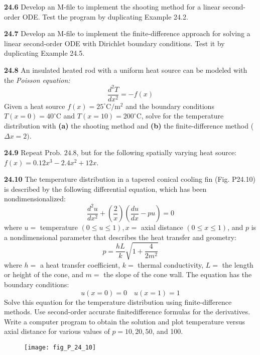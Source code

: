\documentclass[../main.tex]{subfiles}
\begin{document}
\begin{multicols}{2}
    \noindent\textbf{24.6} Develop an M-file to implement the shooting method
    for a linear second-order ODE. Test the program by duplicating Example 24.2.\vspace{2mm}

    \noindent\textbf{24.7} Develop an M-file to implement the finite-difference
    approach for solving a linear second-order ODE with Dirichlet boundary conditions. Test it by duplicating Example 24.5.\vspace{2mm}

    \noindent\textbf{24.8} An insulated heated rod with a uniform heat source can be modeled with the \textit{Poisson equation:}
    $$\frac{d^2T}{dx^2}=-f(x)$$
    Given a heat source $f(x)=25^{\circ} \mathrm{C} / \mathrm{m}^{2}$ and the boundary conditions $T(x=0)=40^{\circ} \mathrm{C}$ and $T(x=10)=200^{\circ} \mathrm{C}$, solve for the temperature distribution with \textbf{(a)} the shooting method and \textbf{(b)} the finite-difference method ($\Delta x=2)$.\vspace{2mm}
    
    \noindent\textbf{24.9} Repeat Prob. $24.8$, but for the following spatially varying heat source: $f(x)=0.12 x^{3}-2.4 x^{2}+12 x$.\vspace{2mm}

    \noindent\textbf{24.10} The temperature distribution in a tapered conical cooling fin (Fig. P24.10) is described by the following differential equation, which has been nondimensionalized:
    $$
    \frac{d^{2} u}{d x^{2}}+\left(\frac{2}{x}\right)\left(\frac{d u}{d x}-p u\right)=0
    $$
    where $u=$ temperature $(0 \leq u \leq 1), x=$ axial distance $(0 \leq x \leq 1)$, and $p$ is a nondimensional parameter that describes the heat transfer and geometry:
    $$
    p=\frac{h L}{k} \sqrt{1+\frac{4}{2 m^{2}}}
    $$
    where $h=$ a heat transfer coefficient, $k=$ thermal conductivity, $L=$ the length or height of the cone, and $m=$ the slope of the cone wall. The equation has the boundary conditions:
    $$
    u(x=0)=0 \quad u(x=1)=1
    $$
    Solve this equation for the temperature distribution using finite-difference methods. Use second-order accurate finitedifference formulas for the derivatives. Write a computer program to obtain the solution and plot temperature versus axial distance for various values of $p=10,20,50$, and 100.
    \begin{figure}[H]
        \centering
        \texttt{[image: fig\_P\_24\_10]}
        \caption{}
       \label{fig:fig_P_24_10} %
    \end{figure}\vspace{2mm}


\end{multicols}
\end{document}
